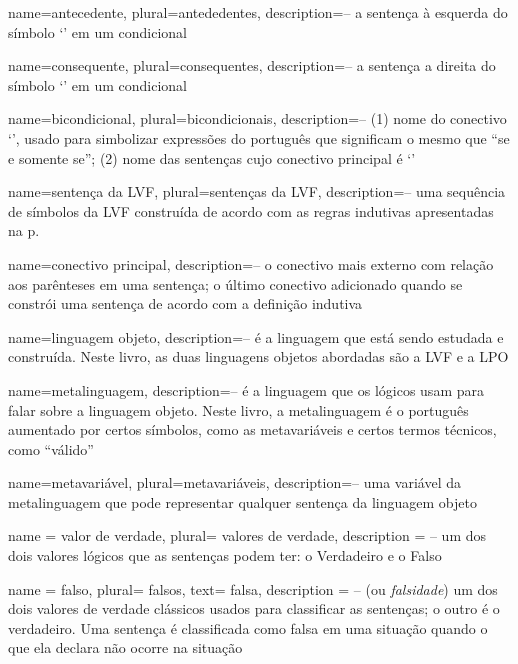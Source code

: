 {
 name=antecedente,
 plural=antededentes,
 description={-- a sentença à esquerda do símbolo `\eif' em um condicional}
}

{
 name=consequente,
 plural=consequentes,
 description={-- a sentença a direita do símbolo `\eif' em um condicional}
}

{
 name=bicondicional,
 plural=bicondicionais,
 description={-- (1) nome do conectivo `\eiff', usado para simbolizar expressões do português que significam o mesmo que ``se e somente se''; (2) nome das sentenças cujo conectivo principal é `\eiff'}
}

{
 name=sentença da LVF,
 plural=sentenças da LVF,
 description={-- uma sequência de símbolos da LVF construída de acordo com as regras indutivas apresentadas na p.~\pageref{TFLsentences}}
}

{
 name=conectivo principal,
 description={-- o conectivo mais externo com relação aos parênteses em uma sentença; o último conectivo adicionado quando se constrói uma sentença de acordo com a definição indutiva}
}

{
 name=linguagem objeto,
 description={-- é a linguagem que está sendo estudada e construída. Neste livro, as duas linguagens objetos abordadas são a LVF e a LPO}
}

{
 name=metalinguagem,
 description={-- é a linguagem que os lógicos usam para falar sobre a linguagem objeto. Neste livro, a metalinguagem é o português aumentado por certos símbolos, como as metavariáveis e certos termos técnicos, como ``válido''}
}

{
 name=metavariável,
 plural=metavariáveis,
 description={-- uma variável da metalinguagem que pode representar qualquer sentença da linguagem objeto}
}

{
 name = valor de verdade,
 plural= valores de verdade,
 description = {-- um dos dois valores lógicos que as sentenças podem ter: o Verdadeiro e o Falso}
}

{
 name = falso,
 plural= falsos,
 text= falsa,
 description = {-- (ou \textit{falsidade}) um dos dois valores de verdade clássicos usados para classificar as sentenças; o outro é o verdadeiro. Uma sentença é classificada como falsa em uma situação quando o que ela declara não ocorre na situação}
}

